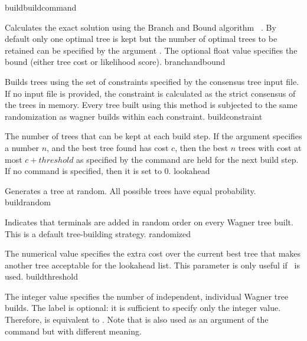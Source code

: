 \begin{command}{build}{buildcommand}
\begin{arguments}
            {Calculates the exact solution using the Branch and Bound algorithm
            ~\cite{hendy1982}. By default only one optimal tree is kept but
            the number of optimal trees to be retained can be specified by the
            argument . The optional float value specifies the
            bound (either tree cost or likelihood score).}
            {branchandbound} 

            {Builds trees using the set of constraints specified by the consensus
            tree input file. If no input file is provided, the constraint is calculated as
            the strict consensus of the trees in memory. Every tree built
            using this method is subjected to the same randomization as wagner
            builds within each constraint.}
            {buildconstraint}

            {The number of trees that can be kept at each build step. If the
             argument 
            specifies a number $n$, and the best tree found has cost $c$, then the best $n$
            trees with cost at most $c + threshold$ as specified by
            the  command are held for the
            next build step. If no  command is specified,
            then it is set to $0$.}
            {lookahead}

            {Generates a tree at random.  All possible trees have equal
            probability.}
            {buildrandom}

            {Indicates that terminals are added in random order on every Wagner
            tree built. This is a default tree-building strategy.}
            {randomized}

            {The numerical value specifies the extra cost over the current best
            tree that makes another tree acceptable for the lookahead list. This 
            parameter is only useful if~ is used.}
            {buildthreshold}
            
            {The integer value specifies the number of independent, individual
            Wagner tree builds. The label  is optional: it is
            sufficient to specify only the integer value. Therefore,  is
            equivalent to .  Note that   is
            also used as an argument of the command 
            but with different meaning.
            
}
\end{arguments}
\end{command}
